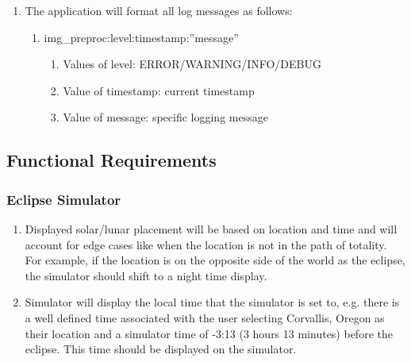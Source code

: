 \documentclass[10pt, onecolumn, draftclsnofoot, letterpaper, compsoc]{IEEEtran}
\begin{document}
\begin{enumerate}
		 \item The application will format all log messages as follows:
		 \begin{enumerate}
		 	\item img\_preproc:level:timestamp:”message”
		 	\begin{enumerate}
		 		\item Values of level: ERROR/WARNING/INFO/DEBUG
		 		\item Value of timestamp: current timestamp
		 		\item Value of message: specific logging message
		 	\end{enumerate}
		 \end{enumerate}
	\end{enumerate}

\subsection{Functional Requirements}

\subsubsection{Eclipse Simulator}
	\begin{enumerate}
		\item Displayed solar/lunar placement will be based on location and 
		time and will account for edge cases like when the location is not in 
		the path of totality. For example, if the location is on the opposite 
		side of the world as the eclipse, the simulator should shift to a night
		 time display.

		\item Simulator will display the local time that the simulator is set 
		to, e.g. there is a well defined time associated with the user 
		selecting Corvallis, Oregon as their location and a simulator time of 
		-3:13 (3 hours 13 minutes) before the eclipse. This time should be 
		displayed on the simulator.
	\end{enumerate}
\end{document}
